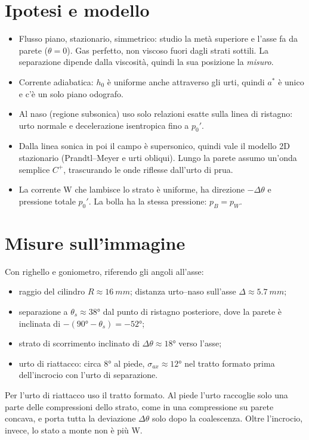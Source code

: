 \documentclass[11pt,a4paper]{article}
\newcommand{\Cp}{C^{+}}
\begin{document}
\section{Ipotesi e modello}
\begin{itemize}
\item Flusso piano, stazionario, simmetrico: studio la metà superiore e l'asse fa da parete ($\theta=0$).
  Gas perfetto, non viscoso fuori dagli strati sottili. La separazione dipende dalla viscosità, quindi la sua
  posizione la \emph{misuro}.
\item Corrente adiabatica: $h_0$ è uniforme anche attraverso gli urti, quindi $a^*$ è unico e c'è un solo piano odografo.
\item Al naso (regione subsonica) uso solo relazioni esatte sulla linea di ristagno: urto normale e
  decelerazione isentropica fino a $p_0'$.
\item Dalla linea sonica in poi il campo è supersonico, quindi vale il modello 2D stazionario
  (Prandtl--Meyer e urti obliqui). Lungo la parete assumo un'onda semplice $\Cp$, trascurando le onde riflesse
  dall'urto di prua.
\item La corrente W che lambisce lo strato è uniforme, ha direzione $-\Delta\theta$ e pressione totale $p_0'$.
  La bolla ha la stessa pressione: $p_B=p_W$.
\end{itemize}

\section{Misure sull'immagine}
Con righello e goniometro, riferendo gli angoli all'asse:
\begin{itemize}
\item raggio del cilindro $R\approx\SI{16}{mm}$; distanza urto--naso sull'asse $\Delta\approx\SI{5.7}{mm}$;
\item separazione a $\theta_s\approx\ang{38}$ dal punto di ristagno posteriore, dove la parete è inclinata di
  $-(\ang{90}-\theta_s)=-\ang{52}$;
\item strato di scorrimento inclinato di $\Delta\theta\approx\ang{18}$ verso l'asse;
\item urto di riattacco: circa \ang{8} al piede, $\sigma_{ax}\approx\ang{12}$ nel tratto formato prima
  dell'incrocio con l'urto di separazione.
\end{itemize}
Per l'urto di riattacco uso il tratto formato. Al piede l'urto raccoglie solo una parte delle compressioni dello
strato, come in una compressione su parete concava, e porta tutta la deviazione $\Delta\theta$ solo dopo la coalescenza.
Oltre l'incrocio, invece, lo stato a monte non è più W.
\end{document}
